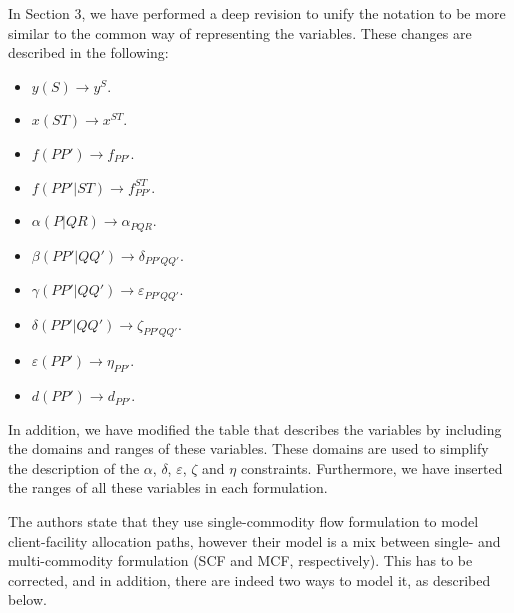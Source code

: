 \documentclass{article}
\newenvironment{reviewer}{\setcounter{pointcounter}{1}}{}
\newcommand{\point}{\text{{\selectfont \thepointcounter} \stepcounter{pointcounter}}}
\begin{document}
\begin{reviewer}
		\begin{tcolorbox}[breakable,enhanced,coltitle=black,colback=green!5!white,colframe=green!75!black,title=\textbf{Answer R2.\point},borderline={1pt}{0pt}{black},boxrule=0pt]
			In Section 3, we have performed a deep revision to unify the notation to be more similar to the common way of representing the variables. These changes are described in the following:
			\begin{itemize}
				\item $y(S)\rightarrow y^S$.
				\item $x(ST)\rightarrow x^{ST}$.
				\item $f(PP')\rightarrow f_{PP'}$.
				\item $f(PP'|ST)\rightarrow f_{PP'}^{ST}$.
				\item $\alpha(P|QR)\rightarrow \alpha_{PQR}$.
				\item $\beta(PP'|QQ')\rightarrow \delta_{PP'QQ'}$.
				\item $\gamma(PP'|QQ')\rightarrow \varepsilon_{PP'QQ'}$.
				\item $\delta(PP'|QQ')\rightarrow \zeta_{PP'QQ'}$.
				\item $\varepsilon(PP')\rightarrow \eta_{PP'}$.
				\item $d(PP')\rightarrow d_{PP'}$.
			\end{itemize}
			
			In addition, we have modified the table that describes the variables by including the domains and ranges of these variables. These domains are used to simplify the description of the $\alpha$, $\delta$, $\varepsilon$, $\zeta$ and $\eta$ constraints. Furthermore, we have inserted the ranges of all these variables in each formulation.
			
			
		\end{tcolorbox}
			
		\begin{itshape}
			 The authors state that they use single-commodity flow formulation to model client-facility allocation paths, however their model is a mix between single- and multi-commodity formulation (SCF and MCF, respectively). This has to be corrected, and in addition, there are indeed two ways to model it, as described below.
			

\end{itshape}
\end{reviewer}
\end{document}
